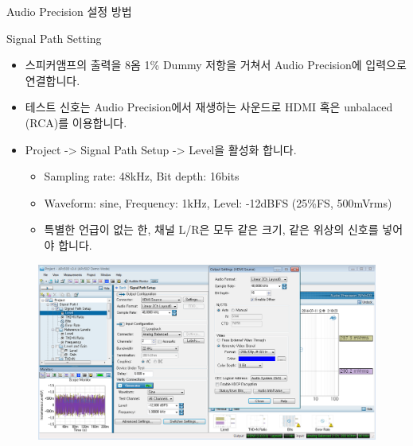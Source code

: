 \documentclass{beamer}
\begin{document}
\begin{frame}{}
\tableofcontents
\huge Audio Precision 설정 방법\\
\end{frame}



\begin{frame}[t]{Signal Path Setting}
\begin{itemize}
\item 스피커앰프의 출력을 8옴 1\% Dummy 저항을 거쳐서 Audio Precision에 입력으로 연결합니다.
\item 테스트 신호는 Audio Precision에서 재생하는 사운드로 HDMI 혹은 unbalaced (RCA)를 이용합니다.
\item Project -> Signal Path Setup -> Level을 활성화 합니다.
	\begin{itemize}
	\item Sampling rate: 48kHz, Bit depth: 16bits
	\item Waveform: sine, Frequency: 1kHz, Level: -12dBFS (25\%FS, 500mVrms)
	\item 특별한 언급이 없는 한, 채널 L/R은 모두 같은 크기, 같은 위상의 신호를 넣어야 합니다.
	\end{itemize}
\end{itemize}

\begin{figure}[r]
	\includegraphics[height=0.4\textwidth]{figure/apsetting/signalPath.png}
\end{figure}
\end{frame}
\end{document}

